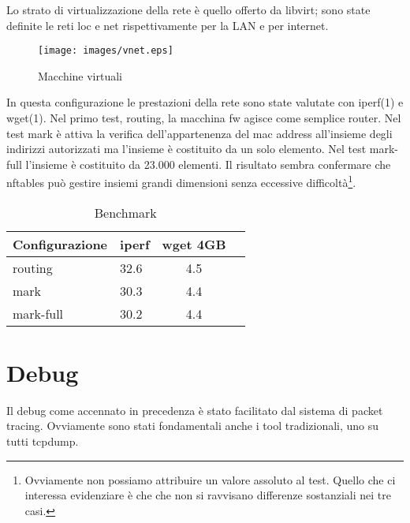 Lo strato di virtualizzazione della rete \`e quello offerto da libvirt; sono
state definite le reti loc e net rispettivamente per la LAN e per internet.
\begin{figure}[H]
\begin{center}
      \texttt{[image: images/vnet.eps]}
      \caption{Macchine virtuali}
      \label{fig:vnet}
\end{center}
\end{figure}
\noindent In questa configurazione le prestazioni della rete sono state valutate con
iperf(1) e wget(1).
Nel primo test, routing, la macchina fw agisce come semplice router.
Nel test mark \`e attiva la verifica dell'appartenenza del mac address
all'insieme degli indirizzi autorizzati ma l'insieme \`e costituito da un solo
elemento.
Nel test mark-full l'insieme \`e costituito da 23.000 elementi.
Il risultato sembra confermare che nftables pu\`o gestire
insiemi grandi dimensioni senza eccessive difficolt\`a\footnote{Ovviamente non
possiamo attribuire un valore assoluto al test. Quello che ci interessa
evidenziare \`e che che non si ravvisano differenze sostanziali nei tre casi.}.

\begin{center}
  \label{tab:benchmark}
  \begin{table}[ht]
    \centering %
     \begin{tabular}{@{}llcc@{}}
     \toprule
     {\bf Configurazione} & {\bf iperf} & {\bf wget 4GB} \\ \midrule
         routing  & 32.6                & 4.5 \\
         mark     & 30.3                & 4.4 \\ 
         mark-full& 30.2                & 4.4 \\ \bottomrule
      \end{tabular}  
    \caption{Benchmark} %
  \end{table}
\end{center}


\section{Debug}

Il debug come accennato in precedenza \`e stato facilitato dal sistema di
packet tracing.
Ovviamente sono stati fondamentali anche i tool tradizionali, uno su tutti tcpdump.

